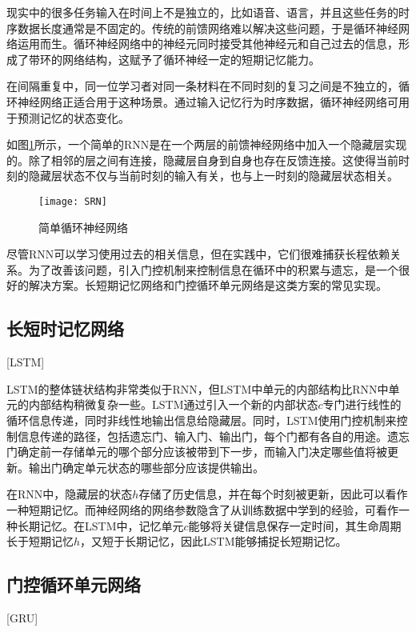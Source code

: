 现实中的很多任务输入在时间上不是独立的，比如语音、语言，并且这些任务的时序数据长度通常是不固定的。传统的前馈网络难以解决这些问题，于是循环神经网络运用而生。循环神经网络中的神经元同时接受其他神经元和自己过去的信息，形成了带环的网络结构，这赋予了循环神经一定的短期记忆能力。

在间隔重复中，同一位学习者对同一条材料在不同时刻的复习之间是不独立的，循环神经网络正适合用于这种场景。通过输入记忆行为时序数据，循环神经网络可用于预测记忆的状态变化。

如图\ref{fig:SRN}所示，一个简单的RNN是在一个两层的前馈神经网络中加入一个隐藏层实现的。除了相邻的层之间有连接，隐藏层自身到自身也存在反馈连接。这使得当前时刻的隐藏层状态不仅与当前时刻的输入有关，也与上一时刻的隐藏层状态相关。

\begin{figure}[htbp]
    \centering
    \texttt{[image: SRN]}
    \caption{简单循环神经网络\cite[137]{qiu2020nndl}}
    \label{fig:SRN}
\end{figure}

尽管RNN可以学习使用过去的相关信息，但在实践中，它们很难捕获长程依赖关系。为了改善该问题，引入门控机制来控制信息在循环中的积累与遗忘，是一个很好的解决方案。长短期记忆网络\cite{hochreiterLongShortTermMemory1997}和门控循环单元网络\cite{choPropertiesNeuralMachine2014}是这类方案的常见实现。

\subsection{长短时记忆网络}[LSTM]

LSTM的整体链状结构非常类似于RNN，但LSTM中单元的内部结构比RNN中单元的内部结构稍微复杂一些。LSTM通过引入一个新的内部状态$c$专门进行线性的循环信息传递，同时非线性地输出信息给隐藏层。同时，LSTM使用门控机制来控制信息传递的路径，包括遗忘门、输入门、输出门，每个门都有各自的用途。遗忘门确定前一存储单元的哪个部分应该被带到下一步，而输入门决定哪些值将被更新。输出门确定单元状态的哪些部分应该提供输出。

在RNN中，隐藏层的状态$h$存储了历史信息，并在每个时刻被更新，因此可以看作一种短期记忆。而神经网络的网络参数隐含了从训练数据中学到的经验，可看作一种长期记忆。在LSTM中，记忆单元$c$能够将关键信息保存一定时间，其生命周期长于短期记忆$h$，又短于长期记忆，因此LSTM能够捕捉长短期记忆。

\subsection{门控循环单元网络}[GRU]

